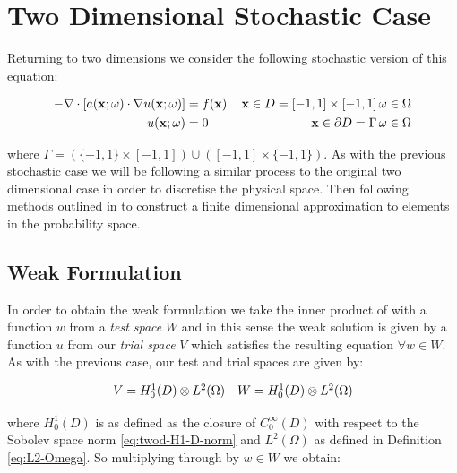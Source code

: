 \chapter{Two Dimensional Stochastic Case}\label{chap:twod-stochastic}

Returning to two dimensions we consider the following stochastic version of
this equation:

\begin{equation}\label{eq:twod-stochastic}
  \begin{aligned}
      -\nabla\cdot\left[a(\mathbf{x};\omega)\cdot\nabla u(\mathbf{x};\omega) \right]
      &= f(\mathbf{x})\, &\mathbf{x} \in D = [-1,1] \times [-1,1]\, \omega \in \Omega \\
      u(\mathbf{x};\omega) &= 0\, &\mathbf{x} \in \partial D = \Gamma\, \omega \in \Omega
  \end{aligned}
\end{equation}

where $\Gamma = (\{-1,1\} \times [-1,1]) \cup ([-1,1] \times \{-1, 1\})$.  As
with the previous stochastic case we will be following a similar process to the
original two dimensional case in order to discretise the physical space. Then
following methods outlined in \cite{general-poly-chaos} to construct a finite
dimensional approximation to elements in the probability space.

\section{Weak Formulation}

In order to obtain the weak formulation we take the inner product of
 with a function $w$ from a \textit{test space} $W$
and in this sense the weak solution is given by a function $u$ from our
\textit{trial space} $V$ which satisfies the resulting equation $\forall w \in
W$. As with the previous case, our test and trial spaces are given by:

\begin{equation}
    \begin{array}{c c}
        V = H^1_0(D) \otimes L^2(\Omega) &
        W = H^1_0(D) \otimes L^2(\Omega)
    \end{array}
\end{equation}

where $H^1_0(D)$ is as defined as the closure of $C_0^\infty(D)$ with respect
to the Sobolev space norm \ref{eq:twod-H1-D-norm} and $L^2(\Omega)$ as defined
in Definition \ref{eq:L2-Omega}. So multiplying through by $w \in W$ we obtain:

